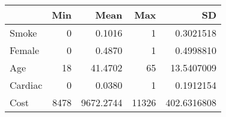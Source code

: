 
\begin{tabular}{lrrrr}
\toprule
  & Min & Mean & Max & SD\\
\midrule
Smoke & 0 & 0.1016 & 1 & 0.3021518\\
Female & 0 & 0.4870 & 1 & 0.4998810\\
Age & 18 & 41.4702 & 65 & 13.5407009\\
Cardiac & 0 & 0.0380 & 1 & 0.1912154\\
Cost & 8478 & 9672.2744 & 11326 & 402.6316808\\
\bottomrule
\end{tabular}